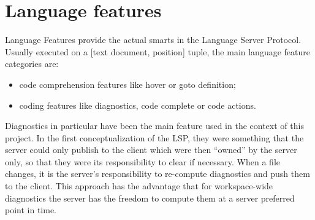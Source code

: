 \section{Language features}\label{sec:cap_sec_subsec}
Language Features provide the actual smarts in the Language Server Protocol. Usually executed on a [text document, position] tuple, the main language feature categories are:
\begin{itemize}
	\item code comprehension features like hover or goto definition;
	\item coding features like diagnostics, code complete or code actions.
\end{itemize}
Diagnostics in particular have been the main feature used in the context of this project. In the first conceptualization of the LSP, they were something that the server could only publish to the client which were then ``owned'' by the server only, so that they were its responsibility to clear if necessary. When a file changes, it is the server's responsibility to re-compute diagnostics and push them to the client.
This approach has the advantage that for workspace-wide diagnostics the server has the freedom to compute them at a server preferred point in time. 


